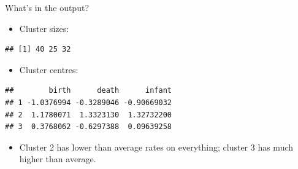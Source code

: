 \documentclass[
  ignorenonframetext,
]{beamer}
\newenvironment{Shaded}{\begin{snugshade}}{\end{snugshade}}
\newcommand{\NormalTok}[1]{#1}
\newcommand{\OperatorTok}[1]{\textcolor[rgb]{0.81,0.36,0.00}{\textbf{#1}}}
\providecommand{\tightlist}{%
  \setlength{\itemsep}{0pt}\setlength{\parskip}{0pt}}
\begin{document}
\begin{frame}[fragile]{What's in the output?}
\protect\hypertarget{whats-in-the-output}{}

\begin{itemize}
\tightlist
\item
  Cluster sizes:
\end{itemize}

\begin{Shaded}
\end{Shaded}

\begin{verbatim}
## [1] 40 25 32
\end{verbatim}

\begin{itemize}
\tightlist
\item
  Cluster centres:
\end{itemize}

\begin{Shaded}
\end{Shaded}

\begin{verbatim}
##        birth      death      infant
## 1 -1.0376994 -0.3289046 -0.90669032
## 2  1.1780071  1.3323130  1.32732200
## 3  0.3768062 -0.6297388  0.09639258
\end{verbatim}

\begin{itemize}
\tightlist
\item
  Cluster 2 has lower than average rates on everything; cluster 3 has
  much higher than average.
\end{itemize}

\end{frame}
\end{document}

